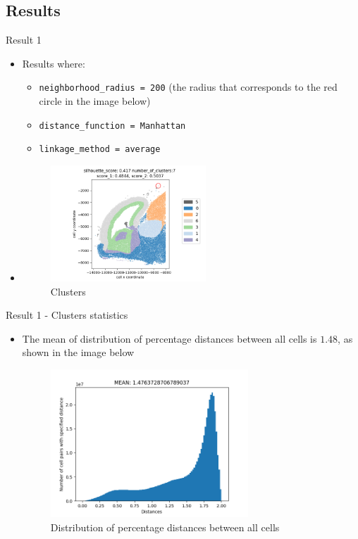 \documentclass{beamer}
\begin{document}
\subsection{Results}
\begin{frame}{Result 1}

\begin{itemize}
    \item<1-> Results where:
    \begin{itemize}
        \item<2-> \texttt{neighborhood\_radius = 200} (the radius that corresponds to the red circle in the image below)
        \item<3-> \texttt{distance\_function = Manhattan}
        \item<4-> \texttt{linkage\_method = average}
    \end{itemize}
    \item<5-> []
    	\begin{figure}
    		\includegraphics[width=0.55\textwidth]{clusters_2.png}
    		\caption{Clusters}
	\end{figure} 
\end{itemize}

\end{frame}
\begin{frame}{Result 1 - Clusters statistics}

\begin{itemize}
    \item<1-> The mean of distribution of percentage distances between all cells is $1.48$, as shown in the image below
    \begin{figure}
    \centering
    \includegraphics[width=0.7\textwidth]{all_distances2.png}
    \caption{Distribution of percentage distances between all cells}
\end{figure} 
   
\end{itemize}
\end{frame}
\end{document}
